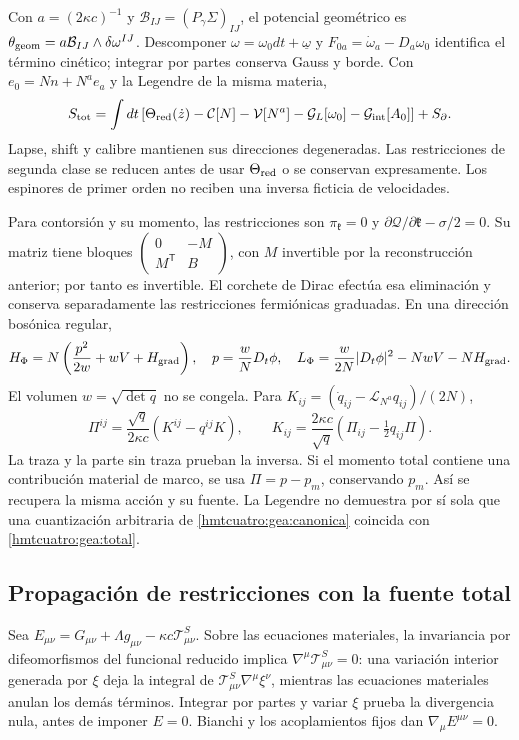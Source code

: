 Con $a=(2\kappa c)^{-1}$ y
$\mathcal B_{IJ}=(P_\gamma\Sigma)_{IJ}$, el potencial geométrico
es $\theta_{\rm geom}=a\mathcal B_{IJ}\wedge\delta\omega^{IJ}$.
Descomponer $\omega=\omega_0dt+\underline\omega$ y
$F_{0a}=\dot\omega_a-D_a\omega_0$ identifica el término cinético;
integrar por partes conserva Gauss y borde.
Con $e_0=Nn+N^ae_a$ y la Legendre de la misma materia,
\begin{equation}
S_{\rm tot}=\int dt\,[\Theta_{\rm red}(\dot z)
-\mathcal C[N]-\mathcal V[N^a]-\mathcal G_L[\omega_0]
-\mathcal G_{\rm int}[A_0]]+S_\partial.
\label{hmtcuatro:gea:canonica}
\end{equation}
Lapse, shift y calibre mantienen sus direcciones degeneradas.
Las restricciones de segunda clase se reducen antes de usar
$\Theta_{\rm red}$ o se conservan expresamente.
Los espinores de primer orden no reciben una inversa ficticia
de velocidades.

Para contorsión y su momento, las restricciones son
$\pi_{\mathfrak k}=0$ y
$\partial\mathcal Q/\partial\mathfrak k-\sigma/2=0$.
Su matriz tiene bloques
$\left(\begin{smallmatrix}0&-M\\M^{\mathsf T}&B\end{smallmatrix}\right)$,
con $M$ invertible por la reconstrucción anterior; por tanto es
invertible. El corchete de Dirac efectúa esa eliminación y conserva
separadamente las restricciones fermiónicas graduadas.
En una dirección bosónica regular,
\[
H_\Phi=N\left(\frac{p^2}{2w}+wV+H_{\rm grad}\right),\quad
p=\frac wN D_t\phi,\quad
L_\Phi=\frac{w}{2N}|D_t\phi|^2-NwV-NH_{\rm grad}.
\]
El volumen $w=\sqrt{\det q}$ no se congela.
Para $K_{ij}=(\dot q_{ij}-\mathcal L_{N^a}q_{ij})/(2N)$,
\[
\Pi^{ij}=\frac{\sqrt q}{2\kappa c}(K^{ij}-q^{ij}K),\qquad
K_{ij}=\frac{2\kappa c}{\sqrt q}
(\Pi_{ij}-\tfrac12q_{ij}\Pi).
\]
La traza y la parte sin traza prueban la inversa.
Si el momento total contiene una contribución material de marco,
se usa $\Pi=p-p_m$, conservando $p_m$.
Así se recupera la misma acción y su fuente. La Legendre no
demuestra por sí sola que una cuantización arbitraria de
\eqref{hmtcuatro:gea:canonica} coincida con
\eqref{hmtcuatro:gea:total}.

\subsection{Propagación de restricciones con la fuente total}
\label{hmtcuatro:gea:restricciones}

Sea $E_{\mu\nu}=G_{\mu\nu}+\Lambda g_{\mu\nu}
-\kappa c\mathcal T^S_{\mu\nu}$.
Sobre las ecuaciones materiales, la invariancia por difeomorfismos
del funcional reducido implica
$\nabla^\mu\mathcal T^S_{\mu\nu}=0$:
una variación interior generada por $\xi$ deja la integral de
$\mathcal T^S_{\mu\nu}\nabla^\mu\xi^\nu$, mientras las ecuaciones
materiales anulan los demás términos. Integrar por partes y variar
$\xi$ prueba la divergencia nula, antes de imponer $E=0$.
Bianchi y los acoplamientos fijos dan $\nabla_\mu E^{\mu\nu}=0$.

